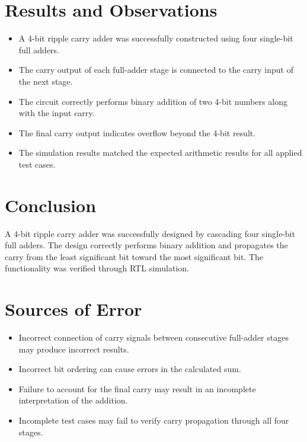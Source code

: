 \documentclass[12pt,a4paper]{report}
\begin{document}
\vspace{0.5cm}

\section{Results and Observations}

\begin{itemize}
    \item A 4-bit ripple carry adder was successfully constructed using four single-bit full adders.
    \item The carry output of each full-adder stage is connected to the carry input of the next stage.
    \item The circuit correctly performs binary addition of two 4-bit numbers along with the input carry.
    \item The final carry output indicates overflow beyond the 4-bit result.
    \item The simulation results matched the expected arithmetic results for all applied test cases.
\end{itemize}

\section{Conclusion}

A 4-bit ripple carry adder was successfully designed by cascading four single-bit full adders. The design correctly performs binary addition and propagates the carry from the least significant bit toward the most significant bit. The functionality was verified through RTL simulation.

\section{Sources of Error}

\begin{itemize}
    \item Incorrect connection of carry signals between consecutive full-adder stages may produce incorrect results.
    \item Incorrect bit ordering can cause errors in the calculated sum.
    \item Failure to account for the final carry may result in an incomplete interpretation of the addition.
    \item Incomplete test cases may fail to verify carry propagation through all four stages.
\end{itemize}
\end{document}
